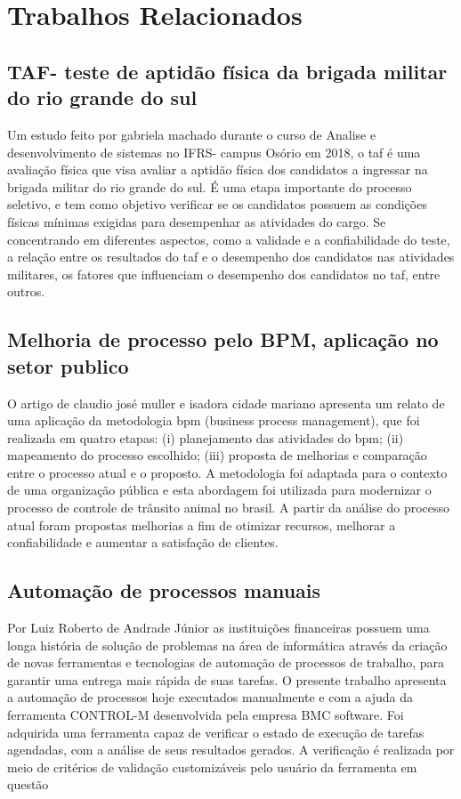 \chapter{Trabalhos Relacionados}
\section{TAF- teste de aptidão física da brigada militar do rio grande do sul}
Um estudo feito por gabriela machado durante o curso de Analise e desenvolvimento de sistemas no IFRS- campus Osório em 2018, o taf é uma avaliação física que visa avaliar a aptidão física dos candidatos a ingressar na brigada militar do rio grande do sul. É uma etapa importante do processo seletivo, e tem como objetivo verificar se os candidatos possuem as condições físicas mínimas exigidas para desempenhar as atividades do cargo. Se concentrando em diferentes aspectos, como a validade e a confiabilidade do teste, a relação entre os resultados do taf e o desempenho dos candidatos nas atividades militares, os fatores que influenciam o desempenho dos candidatos no taf, entre outros.

\section{Melhoria de processo pelo BPM, aplicação no setor publico}
O artigo de claudio josé muller e isadora cidade mariano apresenta um relato de uma aplicação da metodologia bpm (business process management), que foi realizada em quatro etapas: (i) planejamento das atividades do bpm; (ii) mapeamento do processo escolhido; (iii) proposta de melhorias e comparação entre o processo atual e o proposto. A metodologia foi adaptada para o contexto de uma organização pública e esta abordagem foi utilizada para modernizar o processo de controle de trânsito animal no brasil. A partir da análise do processo atual foram propostas melhorias a fim de otimizar recursos, melhorar a confiabilidade e aumentar a satisfação de clientes.

\section{Automação de processos manuais}
Por Luiz Roberto de Andrade Júnior as instituições financeiras possuem uma longa história de solução de problemas na área de informática através da criação de novas ferramentas e tecnologias de automação de processos de trabalho, para garantir uma entrega mais rápida de suas tarefas. O presente trabalho apresenta a automação de processos hoje executados manualmente e com a ajuda da ferramenta CONTROL-M desenvolvida pela empresa BMC software. Foi adquirida uma ferramenta capaz de verificar o estado de execução de tarefas agendadas, com a análise de seus resultados gerados. A verificação é realizada por meio de critérios de validação customizáveis pelo usuário da ferramenta em questão
